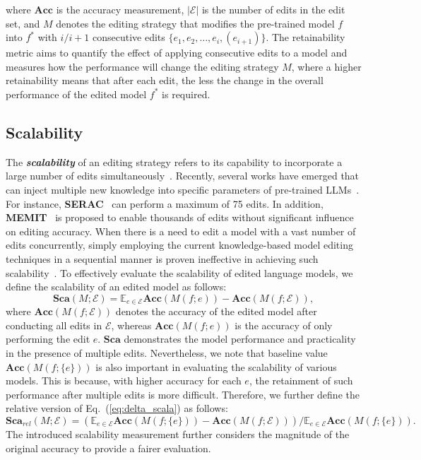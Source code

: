 \documentclass[acmsmall, screen]{acmart}
\begin{document}
where $\mathbf{Acc}$ is the accuracy measurement, $|\mathcal{E}|$ is the number of edits in the edit set, and $M$ denotes the editing strategy that modifies the pre-trained model $f$ into $f^{*}$ with $i/i+1$ consecutive edits $\{e_1,e_2,\dotsc, e_{i}, (e_{i+1})\}$. The retainability metric aims to quantify the effect of applying consecutive edits to a model and measures how the performance will change the editing strategy $M$, where a higher retainability means that after each edit, the less the change in the overall performance of the edited model $f^{*}$ is required. 

\subsection{Scalability}
The \textbf{\textit{scalability}} of an editing strategy refers to its capability to incorporate a large number of edits simultaneously~\cite{p4}.
Recently, several works have emerged that can inject multiple new knowledge into specific parameters of pre-trained LLMs~\cite{yoon2024bigger,zhang2024comprehensive}. For instance, {\textbf{SERAC}}~\cite{SERAC} can perform a maximum of 75 edits. In addition, \textbf{MEMIT}~\cite{meng2023mass} is proposed to enable thousands of edits without significant influence on editing accuracy. When there is a need to edit a model with a vast number of edits concurrently, {simply employing the current knowledge-based model editing techniques in a sequential manner is proven ineffective in achieving such scalability~\cite{yao2023editing}}. To effectively evaluate the scalability of edited language models, we define the scalability of an edited model as follows:
\begin{equation}
    \mathbf{Sca}(M;\mathcal{E})=\mathbb{E}_{e\in\mathcal{E}}\mathbf{Acc}(M(f;e)) -\mathbf{Acc}(M(f;\mathcal{E})),
    \label{eq:delta_scala}
\end{equation}
where $\mathbf{Acc}(M(f;\mathcal{E}))$ denotes the accuracy of the edited model after conducting all edits in $\mathcal{E}$, whereas $\mathbf{Acc}(M(f;e))$ is the accuracy of only performing the edit $e$. $\mathbf{Sca}$ demonstrates the model performance and practicality in the presence of multiple edits. Nevertheless, we note that baseline value $\mathbf{Acc}(M(f;\{e\}))$ is also important in evaluating the scalability of various models. This is because, with higher accuracy for each $e$, the retainment of such performance after multiple edits is more difficult. Therefore, we further define the relative version of Eq.~(\ref{eq:delta_scala}) as follows:
\begin{equation}
        \mathbf{Sca}_{rel}(M;\mathcal{E})=\left(\mathbb{E}_{e\in\mathcal{E}}\mathbf{Acc}(M(f;\{e\})) -\mathbf{Acc}(M(f;\mathcal{E}))\right)/\mathbb{E}_{e\in\mathcal{E}}\mathbf{Acc}(M(f;\{e\})).
\end{equation}
The introduced scalability measurement further considers the magnitude of the original accuracy to provide a fairer evaluation.

\end{document}
